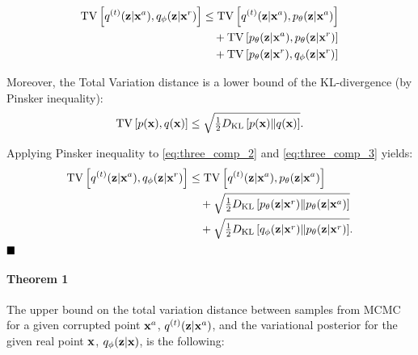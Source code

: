 \begin{align}
\TV{q^{(t)}(\rvz|\rvx^a)}{q_{\phi}(\rvz|\rvx^r)}
&\leq 
    \TV{q^{(t)}(\rvz|\rvx^a)}{p_{\theta}(\rvz|\rvx^a)} \\
     &\quad+ 
    \TV{p_{\theta}(\rvz|\rvx^a)}{p_{\theta}(\rvz|\rvx^r)} \label{eq:three_comp_2}\\
    &\quad+
    \TV{p_{\theta}(\rvz|\rvx^r)}{q_{\phi}(\rvz|\rvx^r)} \label{eq:three_comp_3}
\end{align}

Moreover, the Total Variation distance is a lower bound of the KL-divergence (by Pinsker inequality):
\begin{equation}
    {\mathrm{TV}\left[p({\mathbf{x}}) ,q({\mathbf{x}}) \right]}
    \leq \sqrt{\tfrac12 D_{\mathrm{KL}}\left[p({\mathbf{x}})\|q({\mathbf{x}})\right]} .
\end{equation}

Applying Pinsker inequality to 
\ref{eq:three_comp_2} and \ref{eq:three_comp_3}
yields:
\begin{align}
{\mathrm{TV}\left[q^{(t)}({\mathbf{z}}|{\mathbf{x}}^a) ,q_{\phi}({\mathbf{z}}|{\mathbf{x}}^r) \right]}
&\leq 
    {\mathrm{TV}\left[q^{(t)}({\mathbf{z}}|{\mathbf{x}}^a) ,p_{\theta}({\mathbf{z}}|{\mathbf{x}}^a) \right]} \\
     &\quad+ 
    \sqrt{\tfrac12 D_{\mathrm{KL}}\left[p_{\theta}({\mathbf{z}}|{\mathbf{x}}^r)\|p_{\theta}({\mathbf{z}}|{\mathbf{x}}^a)\right]  } \\
    &\quad+
   \sqrt{\tfrac12  D_{\mathrm{KL}}\left[q_{\phi}({\mathbf{z}}|{\mathbf{x}}^r)\|p_{\theta}({\mathbf{z}}|{\mathbf{x}}^r)\right]} .
\end{align}
$\hfill\blacksquare$

\paragraph{Theorem 1}
The upper bound on the total variation distance between samples from MCMC for a given corrupted point ${\mathbf{x}}^a$, $q^{(t)}({\mathbf{z}}|{\mathbf{x}}^a)$, and the variational posterior for the given real point ${\mathbf{x}}$, $q_{\phi}({\mathbf{z}}|{\mathbf{x}})$, is the following:

